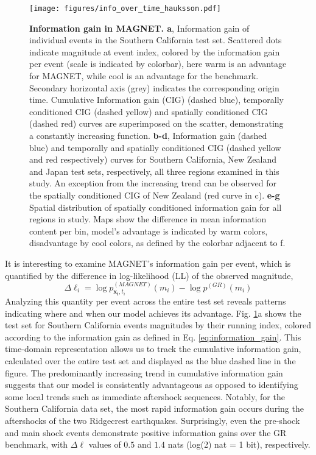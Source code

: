 \documentclass[pdflatex]{sn-jnl}
\begin{document}
    
\begin{figure}[h!]
    \centering
    \texttt{[image: figures/info\_over\_time\_hauksson.pdf]}
    \caption{
        \textbf{Information gain in MAGNET. a}, Information gain of individual events in the Southern California test set. Scattered dots indicate magnitude at event index, colored by the information gain per event (scale is indicated by colorbar), here warm is an advantage for MAGNET, while cool is an advantage for the benchmark. Secondary horizontal axis (grey) indicates the corresponding origin time. Cumulative Information gain (CIG) (dashed blue), temporally conditioned CIG (dashed yellow) and spatially conditioned CIG (dashed red) curves are superimposed on the scatter, demonstrating a constantly increasing function. \textbf{b-d}, Information gain (dashed blue) and temporally and spatially conditioned CIG (dashed yellow and red respectively) curves for Southern California, New Zealand and Japan test sets, respectively, all three regions examined in this study. An exception from the increasing trend can be observed for the spatially conditioned CIG of New Zealand (red curve in c). \textbf{e-g} Spatial distribution of spatially conditioned information gain for all regions in study. Maps show the difference in mean information content per bin, model's advantage is indicated by warm colors, disadvantage by cool colors, as defined by the colorbar adjacent to f.
    }
    \label{fig:info_gain_over_time}
\end{figure}
    

It is interesting to examine MAGNET's information gain per event, which is quantified by the difference in log-likelihood (LL) of the observed magnitude, 
\begin{equation}
    \Delta \ell_i = \log{p_{\pmb{x_i}, t_i}^{(MAGNET)}(m_i)} - \log{p^{(GR)}(m_i)}
    \label{eq:information_gain}
\end{equation}
Analyzing this quantity per event across the entire test set reveals patterns indicating where and when our model achieves its advantage. Fig. \ref{fig:info_gain_over_time}a shows the test set for Southern California events magnitudes by their running index, colored according to the information gain as defined in Eq. \ref{eq:information_gain}. This time-domain representation allows us to track the cumulative information gain, calculated over the entire test set and displayed as the blue dashed line in the figure.
The predominantly increasing trend in cumulative information gain suggests that our model is consistently advantageous as opposed to identifying some local trends such as immediate aftershock sequences. Notably, for the Southern California data set, the most rapid information gain occurs during the aftershocks of the two Ridgecrest earthquakes. Surprisingly, even the pre-shock and main shock events demonstrate positive information gains over the GR benchmark, with $\Delta \ell$ values of $0.5$ and $1.4$ nats (log(2) nat = 1 bit), respectively.
\end{document}
